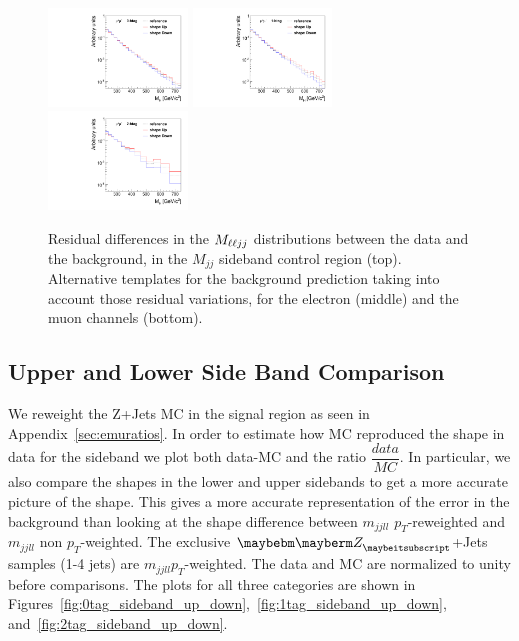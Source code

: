 \begin{figure}[htb]
\begin{center}
{}
\centerline{
\includegraphics[width=0.33\textwidth]{plots/SBres-mm-0b.pdf}
\includegraphics[width=0.33\textwidth]{plots/SBres-mm-1b.pdf}
\includegraphics[width=0.33\textwidth]{plots/SBres-mm-2b.pdf}
}
\caption{Residual differences in the $M_{\ell\ell jj}$ distributions between the data and the background, in the
$M_{jj}$ sideband control region (top). Alternative templates for the background prediction taking into account those residual variations, for the electron (middle) and the muon channels (bottom).    
}
\label{fig:sysshaperes}
\end{center}
\end{figure}



\subsection{Upper and Lower Side Band Comparison}

We reweight the Z+Jets MC in the signal region as seen in Appendix~\ref{sec:emuratios}. In order to estimate how MC reproduced the shape in data for the sideband we plot both data-MC and the ratio $\dfrac{data}{MC}$.  In particular, we also compare the shapes in the lower and upper sidebands to get a more accurate picture of the shape. This gives a more accurate representation of the error in the background than looking at the shape difference between $m_{jjll}$ $p_{T}$-reweighted and $m_{jjll}$ non $p_{T}$-weighted. The exclusive $\PZ$+Jets samples (1-4 jets) are $m_{jjll} p_{T}$-weighted.  The data and MC are normalized to unity before comparisons. The plots for all three categories are shown in Figures~\ref{fig:0tag_sideband_up_down},~\ref{fig:1tag_sideband_up_down}, and~\ref{fig:2tag_sideband_up_down}.  

